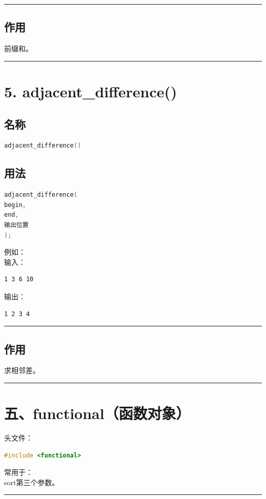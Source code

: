 \documentclass[10pt,twocolumn]{extarticle}
\begin{document}
\noindent\rule{\linewidth}{0.4pt}

\subsection{作用}
前缀和。

\noindent\rule{\linewidth}{0.4pt}

\section{5. adjacent\_difference()}

\subsection{名称}
\begin{lstlisting}[language=C++]
adjacent_difference()
\end{lstlisting}

\subsection{用法}
\begin{lstlisting}[language=C++]
adjacent_difference(
begin,
end,
输出位置
);
\end{lstlisting}
例如：\\
输入：
\begin{lstlisting}
1 3 6 10
\end{lstlisting}
输出：
\begin{lstlisting}
1 2 3 4
\end{lstlisting}

\noindent\rule{\linewidth}{0.4pt}

\subsection{作用}
求相邻差。

\noindent\rule{\linewidth}{0.4pt}

\section{五、functional（函数对象）}

头文件：
\begin{lstlisting}[language=C++]
#include <functional>
\end{lstlisting}
常用于：\\
sort第三个参数。

\noindent\rule{\linewidth}{0.4pt}
\end{document}
